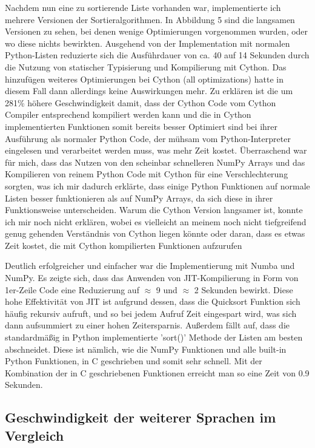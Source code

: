\documentclass[10pt,a4paper]{article}
\begin{document}
Nachdem nun eine zu sortierende Liste vorhanden war, implementierte ich mehrere Versionen der Sortieralgorithmen.
In Abbildung 5 sind die langsamen Versionen zu sehen, bei denen wenige Optimierungen vorgenommen wurden, oder wo diese nichts bewirkten.
Ausgehend von der Implementation mit normalen Python-Listen reduzierte sich die Ausführdauer von ca. 40 auf 14 Sekunden
durch die Nutzung von statischer Typisierung und Kompilierung mit Cython. Das hinzufügen weiteres Optimierungen
bei Cython (all optimizations) hatte in diesem Fall dann allerdings keine Auswirkungen mehr.
Zu erklären ist die um 281\% höhere Geschwindigkeit damit, dass der Cython Code vom Cython Compiler
entsprechend kompiliert werden kann und die in Cython implementierten Funktionen somit bereits besser
Optimiert sind bei ihrer Ausführung als normaler Python Code, der mühsam vom Python-Interpreter eingelesen
und verarbeitet werden muss, was mehr Zeit kostet.
Überraschend war für mich, dass das Nutzen von den scheinbar schnelleren NumPy Arrays und das Kompilieren
von reinem Python Code mit Cython für eine Verschlechterung sorgten, was ich mir dadurch erklärte, dass einige
Python Funktionen auf normale Listen besser funktionieren als auf NumPy Arrays, da sich diese in ihrer Funktionsweise
unterscheiden. Warum die Cython Version langsamer ist, konnte ich mir noch nicht erklären, wobei es vielleicht an meinem
noch nicht tiefgreifend genug gehenden Verständnis von Cython liegen könnte oder daran, dass es etwas Zeit kostet,
die mit Cython kompilierten Funktionen aufzurufen

Deutlich erfolgreicher und einfacher war die Implementierung mit Numba und NumPy.
Es zeigte sich, dass das Anwenden von JIT-Kompilierung in Form von 1er-Zeile Code
eine Reduzierung auf $\approx$ 9 und $\approx$ 2 Sekunden bewirkt. Diese hohe Effektivität von JIT
ist aufgrund dessen, dass die Quicksort Funktion sich häufig rekursiv aufruft, und so bei jedem Aufruf
Zeit eingespart wird, was sich dann aufsummiert zu einer hohen Zeitersparnis.
Außerdem fällt auf, dass die standardmäßig in Python implementierte 'sort()' Methode der Listen
am besten abschneidet. Diese ist nämlich, wie die NumPy Funktionen und alle built-in Python Funktionen, in C geschrieben und
somit sehr schnell. Mit der Kombination der in C geschriebenen Funktionen erreicht man so eine Zeit von 0.9 Sekunden.

\subsection{Geschwindigkeit der weiterer Sprachen im Vergleich}
\end{document}
